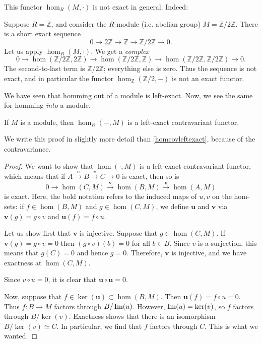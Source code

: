 \newcommand{\ol}[1]{\mathbf{#1}}
This functor $\hom_R(M, \cdot)$  is not exact in general.  Indeed:
\begin{example}
Suppose $R = \mathbb{Z}$, and consider the $R$-module (i.e. abelian group)
$M = \mathbb{Z}/2\mathbb{Z}$. There is a short exact
sequence
\[ 0 \to 2\mathbb{Z} \to \mathbb{Z} \to \mathbb{Z}/2\mathbb{Z} \to 0.  \]
Let us apply $\hom_R(M, \cdot)$. We get a \emph{complex}
\[ 0 \to \hom(\mathbb{Z}/2\mathbb{Z}, 2\mathbb{Z}) \to
\hom(\mathbb{Z}/2\mathbb{Z}, \mathbb{Z}) \to \hom(\mathbb{Z}/2\mathbb{Z},
\mathbb{Z}/2\mathbb{Z}) \to 0.  \]
The second-to-last term is $\mathbb{Z}/2\mathbb{Z}$; everything else is
zero. Thus the sequence is not exact, and in particular the functor
$\hom_{\mathbb{Z}}(\mathbb{Z}/2, -)$ is not an exact functor.
\end{example}


We have seen that homming out of a module is left-exact. Now, we see the same
for homming \emph{into} a module.

\begin{proposition} \label{homcontleftexact}
If $M$ is a module, then $\hom_R(-,M)$ is a left-exact contravariant functor.
\end{proposition}

We write this proof in slightly more detail than \cref{homcovleftexact},
because of the
contravariance.
\begin{proof}
We want to show that $\hom(\cdot, M)$ is a left-exact contravariant functor,
which means that
if $ A \xrightarrow u B \xrightarrow v C \to 0$ is exact, then so is
$$
0 \to \hom(C, M) \xrightarrow{\ol v} \hom(B, M) \xrightarrow{\ol u} \hom(A, M)
$$
is exact. Here, the bold notation refers to the induced maps of $u,v$ on the
hom-sets: if $f \in \hom(B,M)$ and $g \in \hom(C, M)$, we define
$\ol u$ and $\ol v$ via $\ol v(g) = g \circ v$ and
$\ol u(f) = f \circ u$.

Let us show first that $\ol v$ is injective.
Suppose that $g \in \hom(C, M)$. If $\ol v(g) = g \circ v = 0$ then
$(g \circ v)(b) = 0$ for all $b \in B$. Since $v$ is a surjection, this means
that $g(C) = 0$ and hence $g = 0$. Therefore, $\ol v$ is injective, and we
have exactness at $\hom(C, M)$.

Since $v \circ u = 0$, it is clear that $\ol u \circ \ol u = 0$.

Now, suppose that $f \in \ker(\ol u) \subset \hom(B, M)$. Then
$\ol u(f) = f \circ u = 0$.
Thus $f: B \to M$ factors through $B/\operatorname{Im}(u)$.
However, $\operatorname{Im}(u) = \ker(v)$, so $f$ factors through $B/\ker(v)$.
Exactness shows that there is an isomorphism $B/\ker(v) \simeq C$.
In particular, we find that $f$ factors through $C$. This is what we wanted.
\end{proof}


